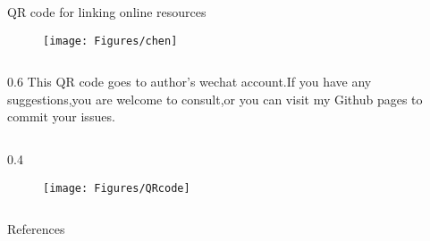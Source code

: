 \documentclass[final]{beamer}
\newcommand{\blu}{\color{blue}}
\newlength{\sepwidthB}
\newlength{\colwidthB}
\newcommand{\separatorcolumnB}{\begin{column}{\sepwidthB}\end{column}}
\begin{document}
\begin{frame}[t]
\begin{columns}
\begin{column}[T]{\colwidthB}
  

    \begin{block}{QR code for linking online resources}
        \begin{figure}
            \centering
            \texttt{[image: Figures/chen]}
        \end{figure}
\begin{column}[T]{0.6\colwidthB}
      This QR code goes to author's wechat account.If you have any suggestions,you are welcome to consult,or you can visit my Github pages to commit your issues.
\end{column}
\begin{column}[T]{0.4\colwidthB}
    \begin{figure}
      \centering
      \texttt{[image: Figures/QRcode]}
      \captionsetup{labelformat=empty}
        \caption{\href{https://github.com/ssskz}{\textbf{\blu{Clickable link to URL}}}}
     \end{figure}
\end{column}
\end{block}

\begin{block}{References}

\nocite{*}

\end{block} 

\end{column}
\separatorcolumnB
\end{columns}
\end{frame}
\end{document}
